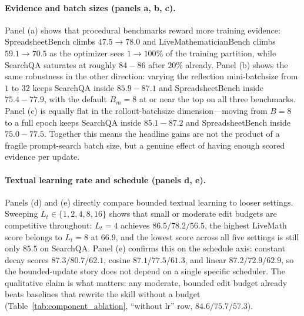 \documentclass{llmxive}
\begin{document}
\paragraph{Evidence and batch sizes (panels a, b, c).}
Panel (a) shows that procedural benchmarks reward more training evidence: SpreadsheetBench climbs $47.5{\to}78.0$ and LiveMathematicianBench climbs $59.1{\to}70.5$ as the optimizer sees $1{\to}100\%$ of the training partition, while SearchQA saturates at roughly $84{-}86$ after $20\%$ already. Panel (b) shows the same robustness in the other direction: varying the reflection mini-batchsize from $1$ to $32$ keeps SearchQA inside $85.9{-}87.1$ and SpreadsheetBench inside $75.4{-}77.9$, with the default $B_m{=}8$ at or near the top on all three benchmarks. Panel (c) is equally flat in the rollout-batchsize dimension---moving from $B{=}8$ to a full epoch keeps SearchQA inside $85.1{-}87.2$ and SpreadsheetBench inside $75.0{-}77.5$. Together this means the headline gains are not the product of a fragile prompt-search batch size, but a genuine effect of having enough scored evidence per update.

\paragraph{Textual learning rate and schedule (panels d, e).}
Panels (d) and (e) directly compare bounded textual learning to looser settings. Sweeping $L_t \in \{1,2,4,8,16\}$ shows that small or moderate edit budgets are competitive throughout: $L_t{=}4$ achieves $86.5/78.2/56.5$, the highest LiveMath score belongs to $L_t{=}8$ at $66.9$, and the lowest score across all five settings is still only $85.5$ on SearchQA. Panel (e) confirms this on the schedule axis: constant decay scores $87.3/80.7/62.1$, cosine $87.1/77.5/61.3$, and linear $87.2/72.9/62.9$, so the bounded-update story does not depend on a single specific scheduler. The qualitative claim is what matters: any moderate, bounded edit budget already beats baselines that rewrite the skill without a budget (Table~\ref{tab:component_ablation}, ``without lr'' row, $84.6/75.7/57.3$).
\end{document}
